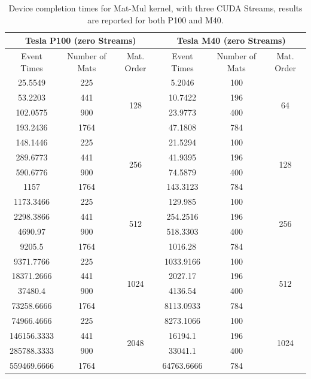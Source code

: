 \begin{table}	
	\centering
	\begin{tabular}{ | c c c  | c c c | } 
		\hline
		\multicolumn{3}{c}{\textbf{Tesla P100 (zero Streams)}} & \multicolumn{3}{c}{\textbf{Tesla M40 (zero Streams)}}\\ [0.5ex]
		\hline\hline
		Event Times  & Number of Mats & Mat. Order & Event Times  & Number of Mats & Mat. Order  \\
		\hline

		25.5549& 225&	\multirow{4}{*}{128}&	5.2046&	100&	\multirow{4}{*}{64}\\
		53.2203&	441&	&	10.7422&	196&	\\
		102.0575&	900&	&	23.9773&	400&	\\
		193.2436&	1764&	&	47.1808&	784&	\\
		\hline
		148.1446&	225&	\multirow{4}{*}{256}&	21.5294&	100&	\multirow{4}{*}{128}\\
		289.6773&	441&	&	41.9395&	196&	\\
		590.6776&	900&	&	74.5879&	400&	\\
		1157&	1764&	&	143.3123&	784&	\\
		\hline
		1173.3466&	225&	\multirow{4}{*}{512}&	129.985&	100&	\multirow{4}{*}{256}\\
		2298.3866&	441&	&	254.2516&	196&	\\
		4690.97&	900&	&	518.3303&	400&	\\
		9205.5&	1764&	&	1016.28&	784&	\\
		\hline
		9371.7766&	225&	\multirow{4}{*}{1024}&	1033.9166&	100&	\multirow{4}{*}{512}\\
		18371.2666&	441&	&	2027.17&	196&	\\
		37480.4&	900&	&	4136.54&	400&	\\
		73258.6666&	1764&	&	8113.0933&	784&	\\
		\hline
		74966.4666&	225&	\multirow{4}{*}{2048}&	8273.1066&	100&	\multirow{4}{*}{1024}\\
		146156.3333&	441&	&	16194.1&	196&	\\
		285788.3333&	900&	&	33041.1&	400&	\\
		559469.6666&	1764&	&	64763.6666&	784&	\\
		
		\hline
		
		
	\end{tabular}
	\caption{Device completion times for Mat-Mul kernel, with three CUDA Streams, results are reported for both P100 and M40.}	
	\label{tab:matvgsThree}		
\end{table}


